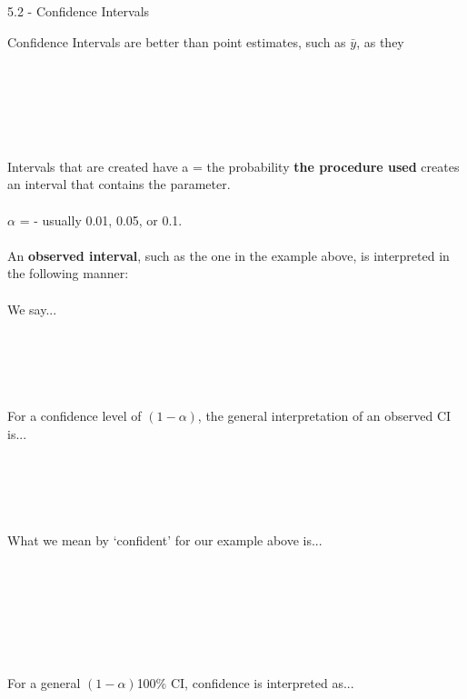 \newpage


\Large 5.2 - Confidence Intervals \\
\normalsize

Confidence Intervals are better than point estimates, such as $\bar{y}$, as they \underbar{~~~~~~~~~~~~~~~~~~~~~~~~~~~~~~~~~~~~~~~~~~~~~~~~}\\~\\~\\~\\~\\~\\~\\

Intervals that are created have a \underbar{~~~~~~~~~~~~~~~~~~~~~~~~~~~~~~~~~~~~~~~~~~~~~~~~~~~~~~~~~~~~~~~~~~~~~~~~~~~~~~~~~~~~~} = the probability \textbf{the procedure used} creates an interval that contains the parameter.\\~\\

$\alpha$ = \underbar{~~~~~~~~~~~~~~~~~~~~~~~~~~~~~~~~~~~~~~~~~~~~~~~~~~~~~~~~~~~~~~~~~~~~~~~~~~~~~~~~} - usually 0.01, 0.05, or 0.1.\\~\\

An \textbf{observed interval}, such as the one in the example above, is interpreted in the following manner:\\~\\
We say...\\~\\~\\~\\~\\~\\
For a confidence level of $(1-\alpha)$, the general interpretation of an observed CI is...\\~\\~\\~\\~\\~\\
What we mean by `confident' for our example above is...\\~\\~\\~\\~\\~\\~\\~\\
For a general $(1-\alpha)$100\% CI, confidence is interpreted as...\\~\\~\\~\\~\\~\\~\\~\\

